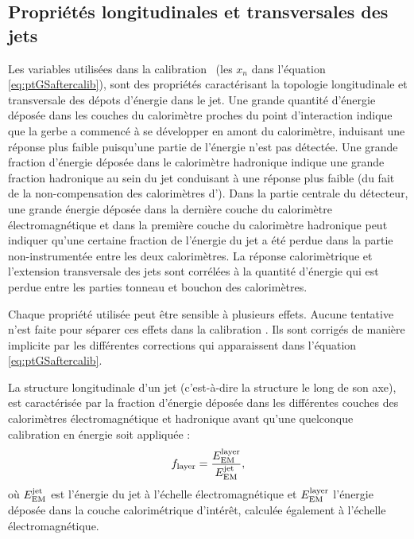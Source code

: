 \subsection{Propri\'et\'es longitudinales et transversales des jets}

Les variables utilis\'ees dans la calibration \GS~(les $x_n$ dans l'\'equation \ref{eq:ptGSaftercalib}), sont des propri\'et\'es caract\'erisant la topologie longitudinale et transversale des d\'epots d'\'energie dans le jet. 
Une grande quantit\'e d'\'energie d\'epos\'ee dans les couches du calorim\`etre proches du point d'interaction indique que la gerbe a commenc\'e \`a se d\'evelopper en amont du calorim\`etre, induisant une r\'eponse plus faible puisqu'une partie de l'\'energie n'est pas d\'etect\'ee. 
Une grande fraction d'\'energie d\'epos\'ee dans le calorim\`etre hadronique indique une grande fraction hadronique au sein du jet conduisant \`a une r\'eponse plus faible (du fait de la non-compensation des calorimètres d'\ATLAS). 
Dans la partie centrale du d\'etecteur, une grande \'energie d\'epos\'ee dans la derni\`ere couche du calorim\`etre \'electromagn\'etique et dans la premi\`ere couche du calorim\`etre hadronique peut indiquer qu'une certaine fraction de l'\'energie du jet a \'et\'e perdue dans la partie non-instrument\'ee entre les deux calorim\`etres. 
La r\'eponse calorim\`etrique et l'extension transversale des jets sont corr\'el\'ees \`a la quantit\'e d'\'energie qui est perdue entre les parties tonneau et bouchon des calorim\`etres.

Chaque propri\'et\'e utilis\'ee peut \^etre sensible \`a plusieurs effets. Aucune tentative n'est faite pour s\'eparer ces effets dans la calibration \GS. Ils sont corrig\'es de mani\`ere implicite par les diff\'erentes corrections qui apparaissent dans l'\'equation \ref{eq:ptGSaftercalib}.

La structure longitudinale d'un jet (c'est-\`a-dire la structure le long de son axe), est caract\'eris\'ee par la fraction d'\'energie d\'epos\'ee dans les diff\'erentes couches des calorim\`etres \'electromagn\'etique et hadronique avant qu'une quelconque calibration en \'energie soit appliqu\'ee :
\begin{equation}
f_{\rm layer} = \frac{E_{\rm EM}^{\rm layer}}{E_{\rm EM}^{\rm jet}},
\end{equation}
o\`u $E_{\rm EM}^{\rm jet}$ est l'\'energie du jet \`a l'\'echelle \'electromagn\'etique et $E_{\rm EM}^{\rm layer}$ l'\'energie d\'epos\'ee dans la couche calorim\'etrique d'int\'er\^et, calcul\'ee \'egalement \`a l'\'echelle \'electromagn\'etique.

